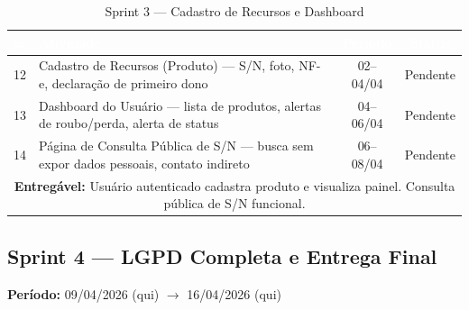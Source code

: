 \documentclass[12pt,a4paper]{article}
\begin{document}
\begin{table}[H]
  \centering
  \caption{Sprint 3 — Cadastro de Recursos e Dashboard}
  \label{tab:sprint3}
  \renewcommand{\arraystretch}{1.3}
  \small
  \begin{tabularx}{\textwidth}{|c|X|c|c|}
    \hline
    \rowcolor{cinzaHeader}
    \textcolor{white}{\textbf{\#}} &
    \textcolor{white}{\textbf{Atividade}} &
    \textcolor{white}{\textbf{Período}} &
    \textcolor{white}{\textbf{Status}} \\
    \hline
    \rowcolor{azulClaro}
    12 & Cadastro de Recursos (Produto) — S/N, foto, NF-e, declaração de primeiro dono & 02--04/04 & Pendente \\
    \hline
    \rowcolor{azulClaro}
    13 & Dashboard do Usuário — lista de produtos, alertas de roubo/perda, alerta de status & 04--06/04 & Pendente \\
    \hline
    \rowcolor{azulClaro}
    14 & Página de Consulta Pública de S/N — busca sem expor dados pessoais, contato indireto & 06--08/04 & Pendente \\
    \hline
    \multicolumn{4}{|p{\dimexpr\textwidth-2\tabcolsep-2\arrayrulewidth}|}{%
      \textbf{Entregável:} Usuário autenticado cadastra produto e visualiza painel. Consulta pública de S/N funcional.} \\
    \hline
  \end{tabularx}
\end{table}

\subsection{Sprint 4 — LGPD Completa e Entrega Final}
\textbf{Período:} 09/04/2026 (qui) $\rightarrow$ 16/04/2026 (qui)
\end{document}
